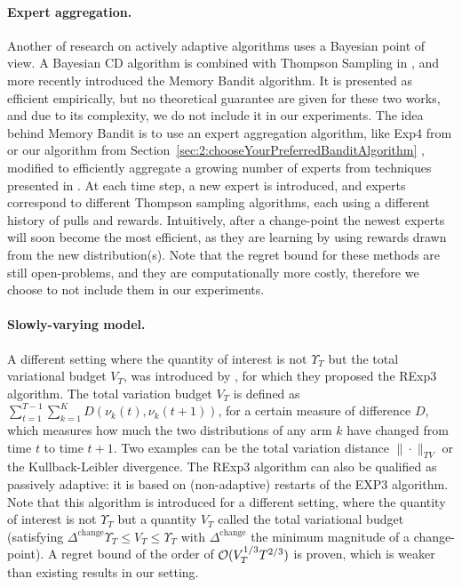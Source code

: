 \paragraph{Expert aggregation.}
%
Another of research on actively adaptive algorithms uses a Bayesian point of view.
A Bayesian CD algorithm is combined with Thompson Sampling in \cite{MellorShapiro13},
and more recently \cite{Alami17} introduced the Memory Bandit algorithm.
It is presented as efficient empirically, but no theoretical guarantee are given for these two works, and due to its complexity, we do not include it in our experiments.
The idea behind Memory Bandit is to use an expert aggregation algorithm, like Exp4 from \cite{Auer02} or our \Aggr{} algorithm from Section~\ref{sec:2:chooseYourPreferredBanditAlgorithm} \cite{Besson2018WCNC}, modified to efficiently aggregate a growing number of experts from techniques presented in \cite{Mourtada17}.
At each time step, a new expert is introduced, and experts correspond to different Thompson sampling algorithms, each using a different history of pulls and rewards. Intuitively, after a change-point the newest experts will soon become the most efficient, as they are learning by using rewards drawn from the new distribution(s).
%
Note that the regret bound for these methods are still open-problems,
and they are computationally more costly,
therefore we choose to not include them in our experiments.


\paragraph{Slowly-varying model.}

A different setting where the quantity of interest is not $\Upsilon_T$ but the total variational budget $V_T$, was introduced by \cite{Besbes14stochastic}, for which they proposed the RExp3 algorithm.
The total variation budget $V_T$ is defined as $\sum_{t=1}^{T-1} \sum_{k=1}^K D(\nu_k(t), \nu_k(t+1))$, for a certain measure of difference $D$, which measures how much the two distributions of any arm $k$ have changed from time $t$ to time $t+1$.
Two examples can be the total variation distance $\|\cdot\|_{TV}$ or the Kullback-Leibler divergence.
%
The RExp3 algorithm can also be qualified as passively adaptive: it is based on (non-adaptive) restarts of the EXP3 algorithm. Note that this algorithm is introduced for a different setting, where the quantity of interest is not $\Upsilon_T$ but a quantity $V_T$ called the total variational budget (satisfying $\Delta^{\text{change}} \Upsilon_T \leq V_T \leq \Upsilon_T$ with $\Delta^{\text{change}}$ the minimum magnitude of a change-point).
A regret bound of the order of $\mathcal{O}(V_T^{1/3} T^{2/3})$ is proven, which is weaker than existing results in our setting.

